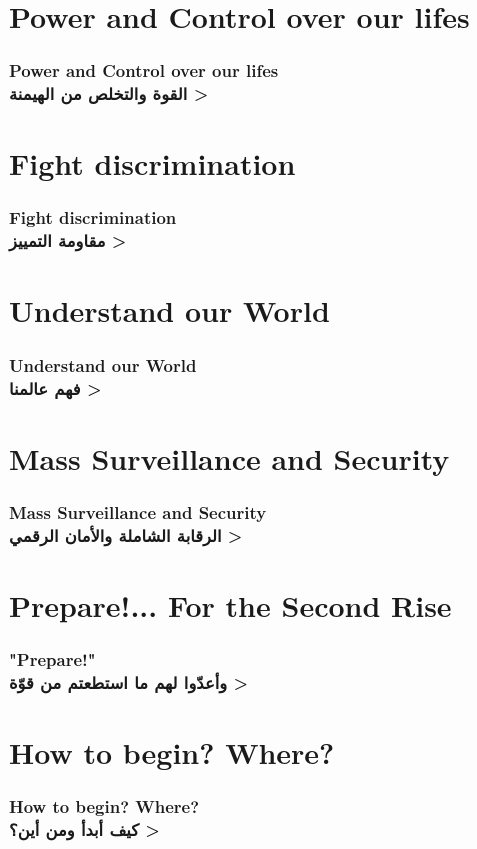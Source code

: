 \documentclass[9pt]{beamer}
\begin{document}
	\section{Power and Control over our lifes}
	\begin{frame}
		\frametitle{
			Power and Control over our lifes\\
			\<
			القوة والتخلص من الهيمنة
			>
		}
	\end{frame}
	
	\section{Fight discrimination}
	\begin{frame}
		\frametitle{
			Fight discrimination\\
			\<
			مقاومة التمييز
			>
		}
	\end{frame}
	
	\section{Understand our World}
	\begin{frame}
		\frametitle{
			Understand our World\\
			\<
			فهم عالمنا
			>
		}
	\end{frame}
	
	\section{Mass Surveillance and Security}
	\begin{frame}
		\frametitle{
			Mass Surveillance and Security\\
			\<
			الرقابة الشاملة والأمان الرقمي
			>
		}
	\end{frame}
	
	\section{Prepare!... For the Second Rise}
	\begin{frame}
		\frametitle{
			"Prepare!"\\
			\<
			وأعدّوا لهم ما استطعتم من قوّة
			>
		}
	\end{frame}
	
	\section{How to begin? Where?}
	\begin{frame}
		\frametitle{
			How to begin? Where?\\
			\<
			كيف أبدأ ومن أين؟
			>
		}
	\end{frame}
	
\end{document}
